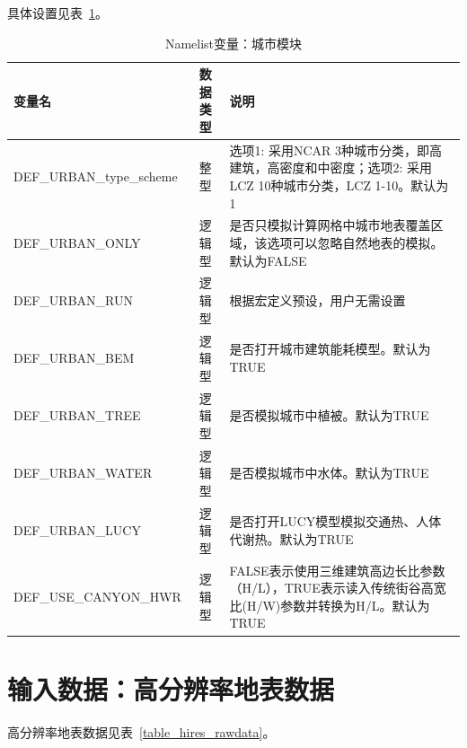 \documentclass[a4paper,12pt,twoside]{article}
\begin{document}
具体设置见表~\ref{table_nl_urban}。
\begin{table}[!htb] \small
\caption{Namelist变量：城市模块}
\label{table_nl_urban}
\centering \renewcommand{\arraystretch}{1.5}
\begin{tabular}{lcp{}}
\toprule
\textbf{变量名} & \textbf{数据类型} & \textbf{说明}\\\midrule
DEF\_URBAN\_type\_scheme & 整型 & 选项1: 采用NCAR 3种城市分类，即高建筑，高密度和中密度；选项2: 采用LCZ 10种城市分类，LCZ 1-10。默认为1\\
DEF\_URBAN\_ONLY & 逻辑型 & 是否只模拟计算网格中城市地表覆盖区域，该选项可以忽略自然地表的模拟。默认为FALSE\\
DEF\_URBAN\_RUN & 逻辑型 & 根据宏定义预设，用户无需设置\\
DEF\_URBAN\_BEM & 逻辑型 & 是否打开城市建筑能耗模型。默认为TRUE\\
DEF\_URBAN\_TREE & 逻辑型 & 是否模拟城市中植被。默认为TRUE\\
DEF\_URBAN\_WATER & 逻辑型 & 是否模拟城市中水体。默认为TRUE\\
DEF\_URBAN\_LUCY & 逻辑型 & 是否打开LUCY模型模拟交通热、人体代谢热。默认为TRUE\\
DEF\_USE\_CANYON\_HWR & 逻辑型 & FALSE表示使用三维建筑高边长比参数（H/L），TRUE表示读入传统街谷高宽比(H/W)参数并转换为H/L。默认为TRUE \\
\bottomrule
\end{tabular} 
\end{table}
\clearpage

\section{输入数据：高分辨率地表数据} \label{landdata}

高分辨率地表数据见表~\ref{table_hires_rawdata}。
\end{document}
